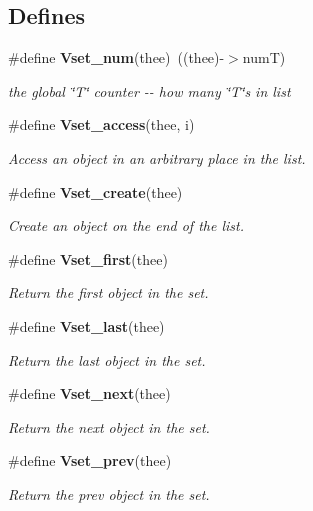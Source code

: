 \subsection*{Defines}
\begin{DoxyCompactItemize}
\item 
\#define {\bf Vset\_\-num}(thee)~((thee)-\/$>$numT)
\begin{DoxyCompactList}\small\item\em the global \char`\"{}T\char`\"{} counter -\/-\/ how many \char`\"{}T\char`\"{}s in list \item\end{DoxyCompactList}\item 
\#define {\bf Vset\_\-access}(thee, i)
\begin{DoxyCompactList}\small\item\em Access an object in an arbitrary place in the list. \item\end{DoxyCompactList}\item 
\#define {\bf Vset\_\-create}(thee)
\begin{DoxyCompactList}\small\item\em Create an object on the end of the list. \item\end{DoxyCompactList}\item 
\#define {\bf Vset\_\-first}(thee)
\begin{DoxyCompactList}\small\item\em Return the first object in the set. \item\end{DoxyCompactList}\item 
\#define {\bf Vset\_\-last}(thee)
\begin{DoxyCompactList}\small\item\em Return the last object in the set. \item\end{DoxyCompactList}\item 
\#define {\bf Vset\_\-next}(thee)
\begin{DoxyCompactList}\small\item\em Return the next object in the set. \item\end{DoxyCompactList}\item 
\#define {\bf Vset\_\-prev}(thee)
\begin{DoxyCompactList}\small\item\em Return the prev object in the set. \item\end{DoxyCompactList}\item 

\end{DoxyCompactItemize}
